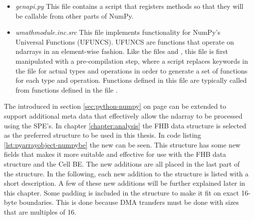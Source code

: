 \begin{itemize}
 \item{\textit{genapi.py} This file contains a script that registers methods so
 that they will be callable from other parts of NumPy.}

 \item{\textit{umathmodule.inc.src} This file implements functionality for
 NumPy's Universal Functions (UFUNCS). UFUNCS are functions that
 operate on ndarrays in an element-wise fashion. Like the files
 and , this file is first
 manipulated with a pre-compilation step, where a script replaces
 keywords in the file for actual types and operations in order to
 generate a set of functions for each type and operation. Functions
 defined in this file are typically called from functions defined in
 the file .}
\end{itemize}

The  introduced in section \ref{sec:python-numpy}
on page \pageref{sec:python-numpy} can be extended to support
additional meta data that effectively allow the ndarray to be
processed using the SPE's. In chapter \ref{chapter:analysis} the FHB
data structure is selected as the preferred structure to be used in
this thesis. In code listing \ref{lst:pyarrayobject-numpybe} the
new  can be seen. This structure has some new
fields that makes it more suitable and effective for use with the FHB
data structure and the Cell BE. The new additions are all placed in
the last part of the structure. In the following, each new addition to
the structure is listed with a short description. A few of these new
additions will be further explained later in this chapter. Some
padding is included in the structure to make it fit on exact 16-byte
boundaries. This is done because DMA transfers must be done with sizes
that are multiples of 16.

